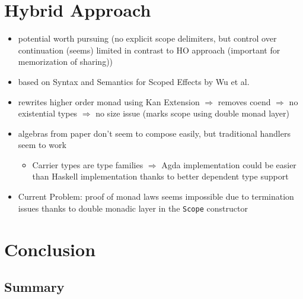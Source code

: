 \documentclass[10pt,a4paper,twoside]{report}
\begin{document}
\chapter{Hybrid Approach}
\begin{itemize}
  \item potential worth pursuing (no explicit scope delimiters, but control
    over continuation (seems) limited in contrast to HO approach (important for
    memorization of sharing))
  \item based on Syntax and Semantics for Scoped Effects by Wu et al.
  \item rewrites higher order monad using Kan Extension $\Rightarrow$ removes
    coend $\Rightarrow$ no existential types $\Rightarrow$ no size issue (marks
    scope using double monad layer)
  \item algebras from paper don't seem to compose easily, but traditional handlers seem to work
  \begin{itemize}
    \item Carrier types are type families $\Rightarrow$ Agda implementation could be easier
      than Haskell implementation thanks to better dependent type support
  \end{itemize}
  \item Current Problem: proof of monad laws seems impossible due to termination
    issues thanks to double monadic layer in the \texttt{Scope} constructor
\end{itemize}

\chapter{Conclusion}
\section{Summary}

\printbibliography
\end{document}
